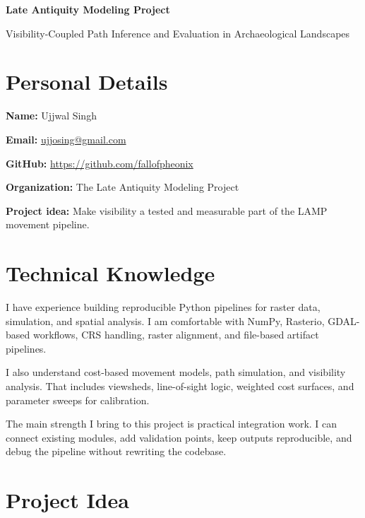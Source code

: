 \documentclass[11pt,a4paper]{article}
\begin{document}
\begin{center}
{\Huge\bfseries Late Antiquity Modeling Project\par}
\vspace{1.1em}
{\Large Visibility-Coupled Path Inference and Evaluation in Archaeological Landscapes\par}
\end{center}

\vspace{1.6em}
\section*{Personal Details}

\textbf{Name:} Ujjwal Singh

\textbf{Email:} \href{mailto:ujjosing@gmail.com}{ujjosing@gmail.com}

\textbf{GitHub:} \url{https://github.com/fallofpheonix}

\textbf{Organization:} The Late Antiquity Modeling Project

\textbf{Project idea:} Make visibility a tested and measurable part of the LAMP movement pipeline.

\clearpage

\section*{Technical Knowledge}

I have experience building reproducible Python pipelines for raster data, simulation, and spatial analysis. I am comfortable with NumPy, Rasterio, GDAL-based workflows, CRS handling, raster alignment, and file-based artifact pipelines.

I also understand cost-based movement models, path simulation, and visibility analysis. That includes viewsheds, line-of-sight logic, weighted cost surfaces, and parameter sweeps for calibration.

The main strength I bring to this project is practical integration work. I can connect existing modules, add validation points, keep outputs reproducible, and debug the pipeline without rewriting the codebase.

\clearpage

\section*{Project Idea}
\end{document}

